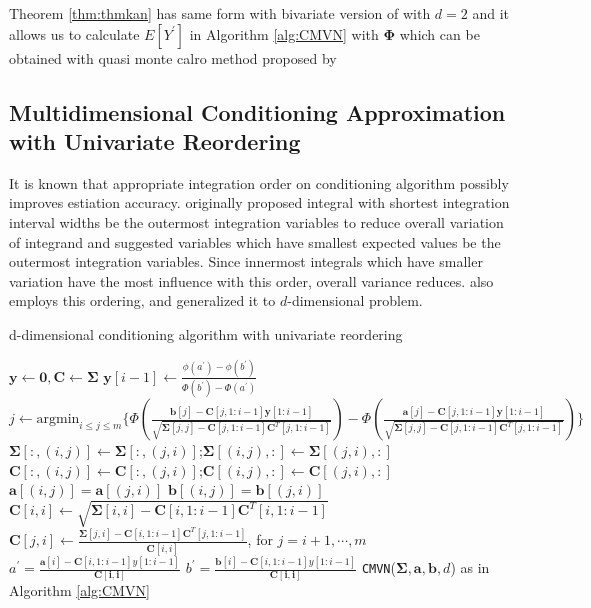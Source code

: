 Theorem \ref{thm:thmkan} has same form with bivariate version of \citet{trinh2015bivariate} with $d=2$ and it allows us to calculate $E[Y^\prime]$ in Algorithm \ref{alg:CMVN} with $\boldsymbol{\Phi}$ which can be obtained with quasi monte calro method proposed by \citet{genz1992numerical}

\subsection{Multidimensional Conditioning Approximation with Univariate Reordering}
It is known that appropriate integration order on conditioning algorithm possibly improves estiation accuracy. \citet{schervish1984algorithm} originally proposed integral with shortest integration interval widths be the outermost integration variables to reduce overall variation of integrand and \citet{gibson1994monte} suggested variables which have smallest expected values be the outermost integration variables. Since innermost integrals which have smaller variation have the most influence with this order, overall variance reduces.
\citet{trinh2015bivariate} also employs this ordering, and \citet{cao2019hierarchical} generalized it to $d$-dimensional problem.
\begin{algorithm}[ht]
	\caption{d-dimensional conditioning algorithm with univariate reordering}
	\begin{algorithmic}[1]
		\State $\mathbf{y}\leftarrow\mathbf{0},\mathbf{C}\leftarrow\boldsymbol{\Sigma}$
		\State $\mathbf{y}[i-1]\leftarrow\frac{\phi(a^\prime)-\phi(b^\prime)}{\Phi(b^\prime)-\Phi(a^\prime)}$
		\EndIf
		\State $j\leftarrow\text{argmin}_{i\leq j\leq m}\{\Phi(\frac{\mathbf{b}[j]-\mathbf{C}[j,1:i-1]\mathbf{y}[1:i-1]}{\sqrt{\boldsymbol{\Sigma}[j,j]-\mathbf{C}[j,1:i-1]\mathbf{C}^T[j,1:i-1]}})-\Phi(\frac{\mathbf{a}[j]-\mathbf{C}[j,1:i-1]\mathbf{y}[1:i-1]}{\sqrt{\boldsymbol{\Sigma}[j,j]-\mathbf{C}[j,1:i-1]\mathbf{C}^T[j,1:i-1]}})\}$
		\State $\boldsymbol{\Sigma}[:,(i,j)]\leftarrow\boldsymbol{\Sigma}[:,(j,i)]$;$\boldsymbol{\Sigma}[(i,j),:]\leftarrow\boldsymbol{\Sigma}[(j,i),:]$
		\State $\mathbf{C}[:,(i,j)]\leftarrow\mathbf{C}[:,(j,i)]$;$\mathbf{C}[(i,j),:]\leftarrow\mathbf{C}[(j,i),:]$
		\State $\mathbf{a}[(i,j)]=\mathbf{a}[(j,i)]$
		\State $\mathbf{b}[(i,j)]=\mathbf{b}[(j,i)]$
		\State $\mathbf{C}[i,i]\leftarrow\sqrt{\boldsymbol{\Sigma}[i,i]-\mathbf{C}[i,1:i-1]\mathbf{C}^T[i,1:i-1]}$
		\State $\mathbf{C}[j,i]\leftarrow \frac{\boldsymbol{\Sigma}[j,i]-\mathbf{C}[i,1:i-1]\mathbf{C}^T[j,1:i-1]}{\mathbf{C}[i,i]}$, for $j=i+1,\cdots,m$
		\State $a^\prime=\frac{\mathbf{a}[i]-\mathbf{C}[i,1:i-1]y[1:i-1]}{\mathbf{C[i,i]}}$
		\State $b^\prime=\frac{\mathbf{b}[i]-\mathbf{C}[i,1:i-1]y[1:i-1]}{\mathbf{C[i,i]}}$
		\EndFor
		\State\Return \texttt{CMVN}($\boldsymbol{\Sigma},\mathbf{a},\mathbf{b},d$) as in Algorithm \ref{alg:CMVN}
		\EndProcedure
	\end{algorithmic}\label{alg:RCMVN}
\end{algorithm}
